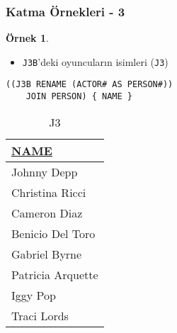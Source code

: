\documentclass[dvipsnames]{beamer}
\theoremstyle{definition}
\theoremstyle{example}
\newtheorem{ornek}[theorem]{Örnek}
\theoremstyle{plain}
\begin{document}
\begin{frame}[fragile]
  \frametitle{Katma Örnekleri - 3}

  \begin{ornek}
    \begin{itemize}
      \item \texttt{J3B}'deki oyuncuların isimleri (\texttt{J3})
    \end{itemize}

    \begin{lstlisting}
((J3B RENAME (ACTOR# AS PERSON#))
    JOIN PERSON) { NAME }
    \end{lstlisting}

    \pause
    \vspace{-10pt}
    \begin{tiny}
    \begin{table}
      \caption{J3}
      \begin{tabular}{|l|}\hline
\underline{NAME} \\[2pt]\hline\hline
Johnny Depp      \\\hline
Christina Ricci  \\\hline
Cameron Diaz     \\\hline
Benicio Del Toro \\\hline
Gabriel Byrne    \\\hline
Patricia Arquette\\\hline
Iggy Pop         \\\hline
Traci Lords      \\\hline
      \end{tabular}
    \end{table}
    \end{tiny}
  \end{ornek}
\end{frame}
% 
% 
% 
\end{document}

